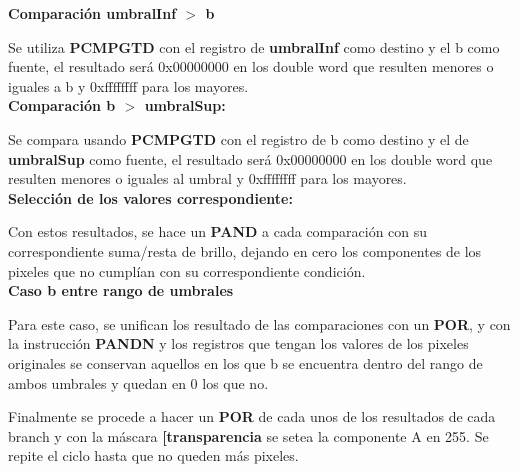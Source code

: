 {\centering\textbf{Comparación umbralInf $>$ b}}

Se utiliza \textbf{PCMPGTD} con el registro de \textbf{umbralInf} como destino y el b como fuente, el resultado será 0x00000000 en los double word que resulten menores o iguales a b y 0xffffffff para los mayores. \\

{\centering\textbf{Comparación b $>$ umbralSup:}}

Se compara usando \textbf{PCMPGTD} con el registro de b como destino y el de \textbf{umbralSup} como fuente, el resultado será 0x00000000 en los double word que resulten menores o iguales al umbral y 0xffffffff para los mayores.\\

{\centering\textbf{Selección de los valores correspondiente:}}

Con estos resultados, se hace un \textbf{PAND} a cada comparación con su correspondiente suma/resta de brillo, dejando en cero los componentes de los pixeles que no cumplían con su correspondiente condición. \\

{\centering\textbf{Caso b entre rango de umbrales}}

Para este caso, se unifican  los resultado de las comparaciones con un \textbf{POR}, y con la instrucción \textbf{PANDN} y los registros que tengan los valores de los pixeles originales se conservan aquellos en los que b se encuentra dentro del rango de ambos umbrales y quedan en 0 los que no.

\medskip

Finalmente se procede a hacer un \textbf{POR} de cada unos de los resultados de cada branch y con la máscara \textbf{[transparencia} se setea la componente A en 255.
Se repite el ciclo hasta que no queden más pixeles.
